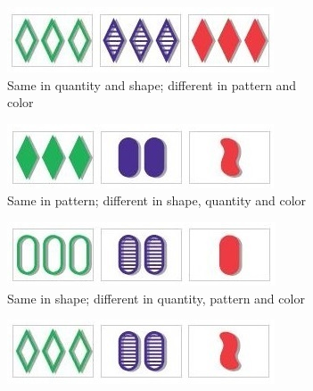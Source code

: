 \begin{problem}
\begin{figure}[H] %
\captionsetup[subfigure]{justification=centering}
\centering
\begin{subfigure}{.47\textwidth}
    \centering
    \includegraphics[width=\linewidth]{set1.jpg}
    \caption{Same in quantity and shape; different in pattern and color}
    \label{fig:labelthefirstfigure}
\end{subfigure}
\begin{subfigure}{.47\textwidth}
    \centering
    \includegraphics[width=\linewidth]{set2.jpg}
    \caption{Same in pattern; different in shape, quantity and color}
    \label{fig:labeltheotherfigure}
\end{subfigure}%
\begin{subfigure}{.47\textwidth}
    \centering
    \includegraphics[width=\linewidth]{set3.jpg}
    \caption{Same in shape; different in quantity, pattern and color}
    \label{fig:labeltheotherfigure}
\end{subfigure}
\begin{subfigure}{.47\textwidth}
    \centering
    \includegraphics[width=\linewidth]{set4.jpg}

\end{subfigure}
\end{figure}
\end{problem}
